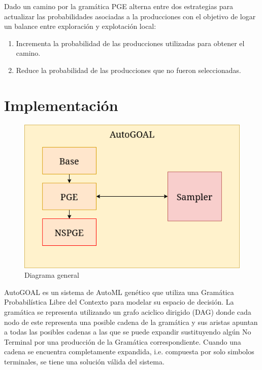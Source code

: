 Dado un camino por la gram\'atica PGE alterna entre dos estrategias para actualizar las probabilidades asociadas a la producciones con el objetivo de logar un balance entre exploraci\'on y explotaci\'on local:
\begin{enumerate}
    \item Incrementa la probabilidad de las producciones utilizadas para obtener el camino.
    \item Reduce la probabilidad de las producciones que no fueron seleccionadas.
\end{enumerate}

\section{Implementaci\'on}

\begin{figure}[ht]
    \centering
    \includegraphics[scale=0.6]{Pictures/autogoal_impl.png}
    \caption{Diagrama general}
    \label{impl:fig:general_diagram}
\end{figure}


AutoGOAL es un sistema de AutoML gen\'etico que utiliza una Gram\'atica Probabil\'istica Libre del Contexto  para modelar su espacio de decisi\'on. La gram\'atica se representa utilizando un grafo aciclico dirigido (DAG) donde cada nodo de este representa una posible cadena de la gram\'atica y sus aristas apuntan a todas las posibles cadenas a las que se puede expandir sustituyendo alg\'un No Terminal por una producci\'on de la Gram\'atica correspondiente. Cuando una cadena se encuentra completamente expandida, i.e. compuesta por solo simbolos terminales, se tiene una soluci\'on v\'alida del sistema. 


